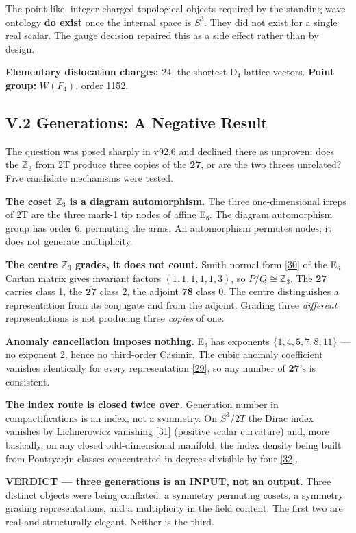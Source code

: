 \documentclass[a4paper,11pt]{article}
\begin{document}
The point-like, integer-charged topological objects required by the standing-wave ontology \textbf{do exist} once the internal space is $S^3$. They did not exist for a single real scalar. The gauge decision repaired this as a side effect rather than by design.

\textbf{Elementary dislocation charges:} 24, the shortest D₄ lattice vectors. \textbf{Point group:} $W(F_4)$, order 1152.

\subsection*{V.2 Generations: A Negative Result}

The question was posed sharply in v92.6 and declined there as unproven: does the $\mathbb{Z}_3$ from 2T produce three copies of the \textbf{27}, or are the two threes unrelated? Five candidate mechanisms were tested.

\textbf{The coset $\mathbb{Z}_3$ is a diagram automorphism.} The three one-dimensional irreps of 2T are the three mark-1 tip nodes of affine E₆. The diagram automorphism group has order 6, permuting the arms. An automorphism permutes nodes; it does not generate multiplicity.

\textbf{The centre $\mathbb{Z}_3$ grades, it does not count.} Smith normal form \hyperref[ref30]{[30]} of the E₆ Cartan matrix gives invariant factors $(1,1,1,1,1,3)$, so $P/Q\cong\mathbb{Z}_3$. The \textbf{27} carries class 1, the $\overline{\mathbf{27}}$ class 2, the adjoint \textbf{78} class 0. The centre distinguishes a representation from its conjugate and from the adjoint. Grading three \textit{different} representations is not producing three \textit{copies} of one.

\textbf{Anomaly cancellation imposes nothing.} E₆ has exponents $\{1,4,5,7,8,11\}$ — no exponent 2, hence no third-order Casimir. The cubic anomaly coefficient vanishes identically for every representation \hyperref[ref29]{[29]}, so any number of \textbf{27}'s is consistent.

\textbf{The index route is closed twice over.} Generation number in compactifications is an index, not a symmetry. On $S^3/2T$ the Dirac index vanishes by Lichnerowicz vanishing \hyperref[ref31]{[31]} (positive scalar curvature) and, more basically, on any closed odd-dimensional manifold, the index density being built from Pontryagin classes concentrated in degrees divisible by four \hyperref[ref32]{[32]}.

\textbf{VERDICT — three generations is an INPUT, not an output.} Three distinct objects were being conflated: a symmetry permuting cosets, a symmetry grading representations, and a multiplicity in the field content. The first two are real and structurally elegant. Neither is the third.
\end{document}
